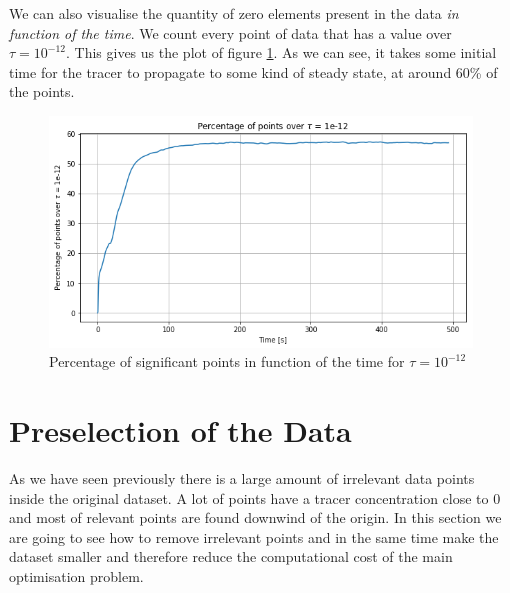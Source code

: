 We can also visualise the quantity of zero elements present in the data \textit{in function of the time}. We count every point of data that has a value over $\tau = 10^{-12}$. This gives us the plot of figure \ref{fig:sumtime}. As we can see, it takes some initial time for the tracer to propagate to some kind of steady state, at around 60\% of the points.

\begin{figure}[h]
\centering
	\includegraphics[width = 0.6 \textwidth]{figures/DataAnalysis/SumDataTime}
	\caption{Percentage of significant points in function of the time for $\tau = 10^{-12}$}
	\label{fig:sumtime}
\end{figure}




\section{Preselection of the Data} \label{sec:preselection}
%
%
%

As we have seen previously there is a large amount of irrelevant data points inside the original dataset. A lot of points have a tracer concentration close to $0$ and most of relevant points are found downwind of the origin. In this section we are going to see how to remove irrelevant points and in the same time make the dataset smaller and therefore reduce the computational cost of the main optimisation problem. 

